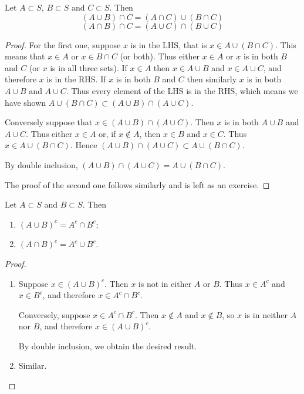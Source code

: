 \begin{proposition}
Let $A\subset S$, $B\subset S$ and $C\subset S$. Then
\begin{equation}
(A\cup B)\cap C = (A\cap C)\cup(B\cap C)
\end{equation}
\begin{equation}
(A\cap B)\cap C = (A\cup C)\cap(B\cup C)
\end{equation}
\end{proposition}
\begin{proof}
For the first one, suppose $x$ is in the LHS, that is $x \in A\cup(B \cap C)$. This means that $x \in A$ or $x \in B \cap C$ (or both). Thus either $x \in A$ or $x$ is in both $B$ and $C$ (or $x$ is in all three sets). If $x \in A$ then $x \in A\cup B$ and $x \in A\cup C$, and therefore $x$ is in the RHS. If $x$ is in both $B$ and $C$ then similarly $x$ is in both $A\cup B$ and $A\cup C$. Thus every element of the LHS is in the RHS, which means we have shown $A \cup (B \cap C) \subset (A \cup B) \cap (A \cup C)$.

Conversely suppose that $x \in (A \cup B) \cap (A \cup C)$. Then $x$ is in both $A \cup B$ and $A\cup C$. Thus either $x \in A$ or, if $x \notin A$, then $x \in B$ and $x \in C$. Thus $x \in A\cup(B \cap C)$. Hence $(A \cup B) \cap (A \cup C) \subset A \cup (B \cap C)$.

By double inclusion, $(A \cup B) \cap (A \cup C) = A \cup (B \cap C)$.

The proof of the second one follows similarly and is left as an exercise.
\end{proof}

\begin{proposition}
Let $A\subset S$ and $B\subset S$. Then
\begin{enumerate}[label=(\roman*)]
\item $(A \cup B)^c = A^c \cap B^c$;
\item $(A \cap B)^c = A^c \cup B^c$.
\end{enumerate}
\end{proposition}

\begin{proof} \
\begin{enumerate}[label=(\roman*)]
\item Suppose $x \in (A \cup B)^c$. Then $x$ is not in either $A$ or $B$. Thus $x \in A^c$ and $x \in B^c$, and therefore $x \in A^c \cap B^c$. 

Conversely, suppose $x \in A^c \cap B^c$. Then $x \notin A$ and $x \notin B$, so $x$ is in neither $A$ nor $B$, and therefore $x \in (A \cup B)^c$.

By double inclusion, we obtain the desired result.

\item Similar.
\end{enumerate}
\end{proof}

